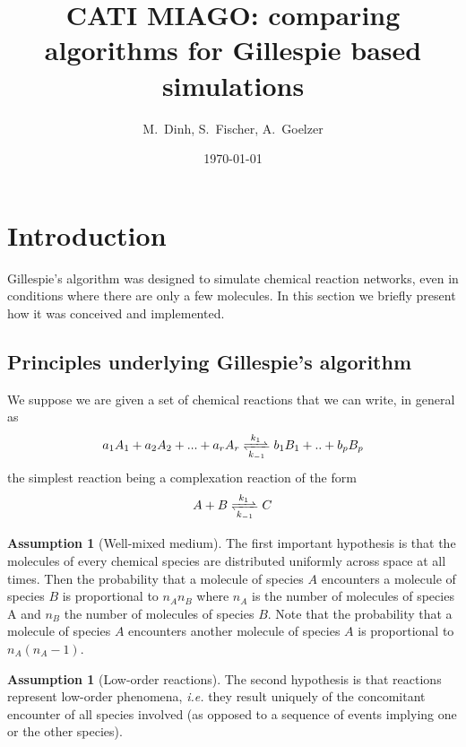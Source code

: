 \documentclass[12pt]{scrartcl}
\theoremstyle{definition}
\newtheorem{assum}[thm]{Assumption}
\theoremstyle{remark}
\numberwithin{equation}{section}
\newcommand{\reactionRev}[4]{#1 \ce{<=>[#3][#4]} #2}
\begin{document}
\title{{CATI MIAGO}: comparing algorithms for Gillespie based simulations}%
\author{M.~Dinh, S.~Fischer, A.~Goelzer}%
\date{\today}%

\maketitle

\newpage

\tableofcontents

\newpage

\section{Introduction}

Gillespie's algorithm was designed to simulate chemical reaction networks, even in conditions where there are only a few molecules. In this section we briefly present how it was conceived and implemented.

\subsection{Principles underlying Gillespie's algorithm}

We suppose we are given a set of chemical reactions that we can write, in general as
\[
\reactionRev{a_1A_1 + a_2A_2 + ... + a_rA_r}{b_1B_1+..+b_pB_p}{k_1}{k_{-1}}
\]
the simplest reaction being a complexation reaction of the form
\[
\reactionRev{A + B}{C}{k_1}{k_{-1}}
\]

\begin {assum}[Well-mixed medium] 
  The first important hypothesis is that the molecules of every chemical species are distributed uniformly across space at all times. Then the probability that a molecule of species $A$ encounters a molecule of species $B$ is proportional to $n_An_B$ where $n_A$ is the number of molecules of species A and $n_B$ the number of molecules of species $B$. Note that the probability that a molecule of species $A$ encounters another molecule of species $A$ is proportional to $n_A(n_A-1)$.
\end {assum}

\begin {assum}[Low-order reactions] 
  The second hypothesis is that reactions represent low-order phenomena, \textit{i.e.} they result uniquely of the concomitant encounter of all species involved (as opposed to a sequence of events implying one or the other species).
\end {assum}
\end{document}
